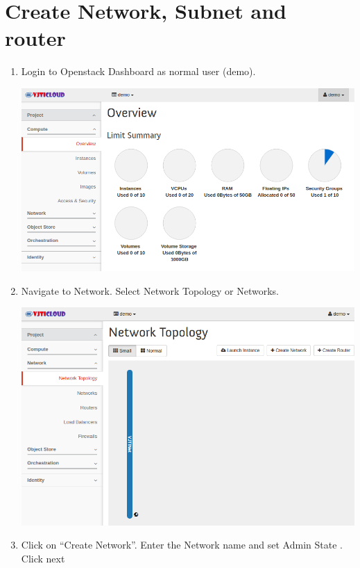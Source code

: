 \documentclass[letterpaper,10pt,english]{sphinxmanual}
\begin{document}
\section{Create Network, Subnet and router}
\label{_source/user_guide/launch_instance:create-network-subnet-and-router}\label{_source/user_guide/launch_instance::doc}\label{_source/user_guide/launch_instance:create-network}\begin{enumerate}
\item {} 
Login to Openstack Dashboard as normal user (demo).

\includegraphics{instance-overview.png}

\item {} 
Navigate to Network. Select Network Topology or Networks.

\includegraphics{nt-network-topology.png}

\item {} 
Click on ``Create Network''. Enter the Network name and set Admin State . Click next


\end{enumerate}
\end{document}
